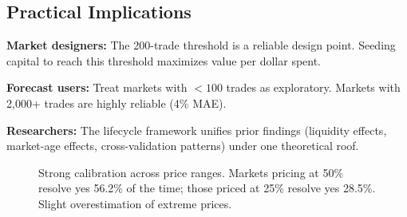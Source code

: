 \documentclass[a4paper,11pt]{article}
\theoremstyle{plain}
\theoremstyle{definition}
\begin{document}
\subsection{Practical Implications}

\textbf{Market designers:} The 200-trade threshold is a reliable design point. Seeding capital to reach this threshold maximizes value per dollar spent.

\textbf{Forecast users:} Treat markets with $<100$ trades as exploratory. Markets with 2,000+ trades are highly reliable (4\% MAE).

\textbf{Researchers:} The lifecycle framework unifies prior findings (liquidity effects, market-age effects, cross-validation patterns) under one theoretical roof.

\begin{figure}[h]
\centering
\small
{}
\caption{Strong calibration across price ranges. Markets pricing at 50\% resolve yes 56.2\% of the time; those priced at 25\% resolve yes 28.5\%. Slight overestimation of extreme prices.}
\label{fig:win_rate_by_price}
\end{figure}
\end{document}
